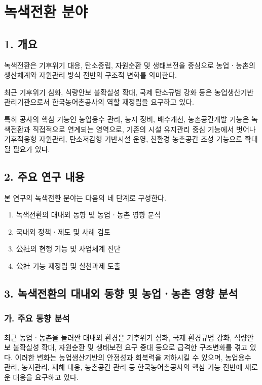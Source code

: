 \section*{녹색전환 분야}

\subsection*{1. 개요}

녹색전환은 기후위기 대응, 탄소중립, 자원순환 및 생태보전을 중심으로
농업ㆍ농촌의 생산체계와 자원관리 방식 전반의 구조적 변화를 의미한다.

최근 기후위기 심화, 식량안보 불확실성 확대, 국제 탄소규범 강화 등은
농업생산기반 관리기관으로서 한국농어촌공사의 역할 재정립을 요구하고 있다.

특히 공사의 핵심 기능인 농업용수 관리, 농지 정비, 배수개선,
농촌공간개발 기능은 녹색전환과 직접적으로 연계되는 영역으로,
기존의 시설 유지관리 중심 기능에서 벗어나
기후적응형 자원관리, 탄소저감형 기반시설 운영,
친환경 농촌공간 조성 기능으로 확대될 필요가 있다.

\subsection*{2. 주요 연구 내용}

본 연구의 녹색전환 분야는 다음의 네 단계로 구성한다.

\begin{enumerate}
    \item 녹색전환의 대내외 동향 및 농업ㆍ농촌 영향 분석
    \item 국내외 정책ㆍ제도 및 사례 검토
    \item 公社의 현행 기능 및 사업체계 진단
    \item 公社 기능 재정립 및 실천과제 도출
\end{enumerate}

\subsection*{3. 녹색전환의 대내외 동향 및 농업ㆍ농촌 영향 분석}

\subsubsection*{가. 주요 동향 분석}

최근 농업ㆍ농촌을 둘러싼 대내외 환경은 기후위기 심화, 국제 환경규범 강화,
식량안보 불확실성 확대, 자원순환 및 생태보전 요구 증대 등으로 급격한 구조변화를 겪고 있다.
이러한 변화는 농업생산기반의 안정성과 회복력을 저하시킬 수 있으며,
농업용수 관리, 농지관리, 재해 대응, 농촌공간 관리 등
한국농어촌공사의 핵심 기능 전반에 새로운 대응을 요구하고 있다.

